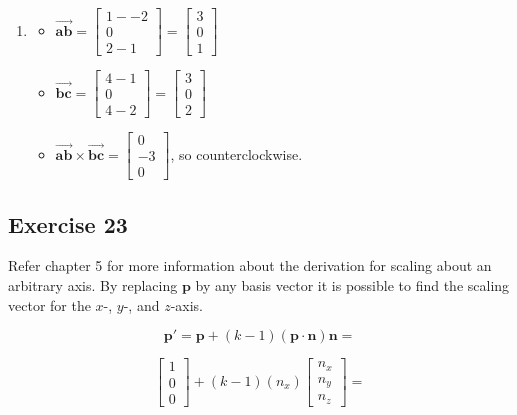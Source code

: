 \documentclass[11pt]{article}
\begin{document}
\begin{enumerate}[a.]
\begin{enumerate}[1.)]
		\item %
		\begin{itemize}
			\item $\vec{\textbf{ab}} = 
			\begin{bmatrix}
				1--2 \\ 0 \\ 2-1
			\end{bmatrix}=
			\begin{bmatrix}
				3 \\ 0 \\ 1
			\end{bmatrix}$
			\item $\vec{\textbf{bc}} = 
			\begin{bmatrix}
				4-1 \\ 0 \\ 4-2
			\end{bmatrix}=
			\begin{bmatrix}
				3 \\ 0 \\ 2
			\end{bmatrix}$
			\item $\vec{\textbf{ab}}\times\vec{\textbf{bc}} = 
			\begin{bmatrix}
				0 \\ -3 \\ 0
			\end{bmatrix}$, so counterclockwise.
		\end{itemize}
	\end{enumerate}
\end{enumerate}

\subsection{Exercise 23}

Refer chapter 5 for more information about the derivation for scaling about an arbitrary axis. By replacing $\textbf{p}$ by any basis vector it is possible to find the scaling vector for the $x$-, $y$-, and $z$-axis.

$$\textbf{p}'=\textbf{p}+(k-1)(\textbf{p} \cdot \textbf{n})\textbf{n}=$$

$$\begin{bmatrix}
1 \\ 0 \\ 0
\end{bmatrix}+(k-1)(n_x)\begin{bmatrix}
n_x \\ n_y \\ n_z
\end{bmatrix}=
$$
\end{document}
